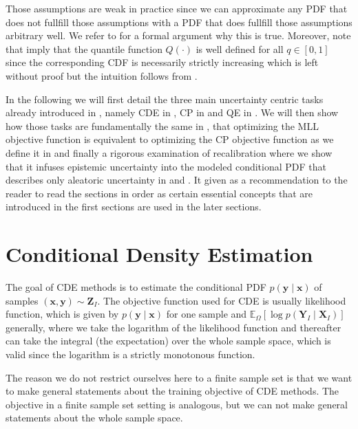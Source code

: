 Those assumptions are weak in practice since we can approximate any PDF that does not fullfill those assumptions with a PDF that does fullfill those assumptions arbitrary well. We refer to \cite{klenke2013probability} for a formal argument why this is true. Moreover, note that  imply that the quantile function $Q(\cdot)$ is well defined for all $q\in[0,1]$ since the corresponding CDF is necessarily strictly increasing which is left without proof but the intuition follows from .

In the following we will first detail the three main uncertainty centric tasks already introduced in , namely CDE in , CP in  and QE in . We will then show how those tasks are fundamentally the same in , that optimizing the MLL objective function is equivalent to optimizing the CP objective function as we define it in  and finally a rigorous examination of recalibration where we show that it infuses epistemic uncertainty into the modeled conditional PDF that describes only aleatoric uncertainty in  and . It given as a recommendation to the reader to read the sections in order as certain essential concepts that are introduced in the first sections are used in the later sections.

\section{Conditional Density Estimation}\label{sec:cde}

The goal of CDE methods is to estimate the conditional PDF $p(\mathbf{y}\mid \mathbf{x})$ of samples $(\mathbf{x}, \mathbf{y}) \sim \mathbf{Z}_I$. The objective function used for CDE is usually likelihood function, which is given by $p(\mathbf{y}\mid \mathbf{x})$ for one sample and $\mathbb{E}_{\Omega}\left[\log p(\mathbf{Y}_I \mid \mathbf{X}_I)\right]$ generally, where we take the logarithm of the likelihood function and thereafter can take the integral (the expectation) over the whole sample space, which is valid since the logarithm is a strictly monotonous function.

The reason we do not restrict ourselves here to a finite sample set is that we want to make general statements about the training objective of CDE methods. The objective in a finite sample set setting is analogous, but we can not make general statements about the whole sample space. %


